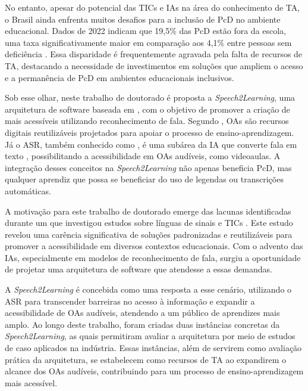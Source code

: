 No entanto, apesar do potencial das TICs e IAs na área do conhecimento de TA, o Brasil ainda enfrenta muitos desafios para a inclusão de PcD no ambiente educacional. Dados de 2022 indicam que 19,5\% das PcD estão fora da escola, uma taxa significativamente maior em comparação aos 4,1\% entre pessoas sem deficiência \cite{IBGE2023}. Essa disparidade é frequentemente agravada pela falta de recursos de TA, destacando a necessidade de investimentos em soluções que ampliem o acesso e a permanência de PcD em ambientes educacionais inclusivos.

Sob esse olhar, neste trabalho de doutorado é proposta a \textit{Speech2Learning}, uma arquitetura de software baseada em , com o objetivo de promover a criação de  mais acessíveis utilizando reconhecimento de fala. Segundo , OAs são recursos digitais reutilizáveis projetados para apoiar o processo de ensino-aprendizagem. Já o ASR, também conhecido como , é uma subárea da IA que converte fala em texto \cite{Jurafsky2024}, possibilitando a acessibilidade em OAs audíveis, como videoaulas. A integração desses conceitos na \textit{Speech2Learning} não apenas beneficia PcD, mas qualquer aprendiz que possa se beneficiar do uso de legendas ou transcrições automáticas.

A motivação para este trabalho de doutorado emerge das lacunas identificadas durante um  que investigou estudos sobre línguas de sinais e TICs \cite{FalvoJr2020_FIE, FalvoJr2020_SBIE, FalvoJr2021_RENOTE}. Este estudo revelou uma carência significativa de soluções padronizadas e reutilizáveis para promover a acessibilidade em diversos contextos educacionais. Com o advento das IAs, especialmente em modelos de reconhecimento de fala, surgiu a oportunidade de projetar uma arquitetura de software que atendesse a essas demandas.

A \textit{Speech2Learning} é concebida como uma resposta a esse cenário, utilizando o ASR para transcender barreiras no acesso à informação e expandir a acessibilidade de OAs audíveis, atendendo a um público de aprendizes mais amplo. Ao longo deste trabalho, foram criadas duas instâncias concretas da \textit{Speech2Learning}, as quais permitiram avaliar a arquitetura por meio de estudos de caso aplicados na indústria. Essas instâncias, além de servirem como avaliação prática da arquitetura, se estabelecem como recursos de TA ao expandirem o alcance dos OAs audíveis, contribuindo para um processo de ensino-aprendizagem mais acessível.

